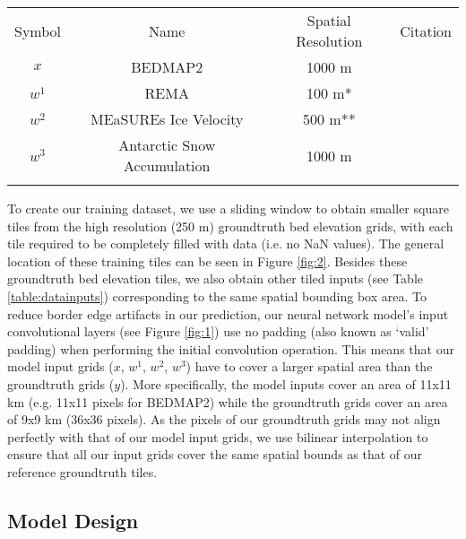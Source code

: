 \documentclass[tc, manuscript]{copernicus}
\begin{document}
\begin{table*}[htbp]
  \caption{Remote Sensing dataset inputs into the DeepBedMap neural network model.}
  \label{table:datainputs}
  \begin{tabular}{cccc}
  \tophline
  Symbol & Name & Spatial Resolution & Citation \\
  \middlehline
  $x$ & BEDMAP2 & 1000 m & \cite{FretwellBedmap2improvedice2013} \\
  $w^1$ & REMA & 100 m* & \cite{HowatReferenceElevationModel2019} \\
  $w^2$ & MEaSUREs Ice Velocity & 500 m** & \cite{MouginotContinentwideinterferometric2019} \\
  $w^3$ & Antarctic Snow Accumulation & 1000 m & \cite{ArthernAntarcticsnowaccumulation2006} \\
  \bottomhline
  \end{tabular}
\end{table*}

To create our training dataset, we use a sliding window to obtain smaller square tiles from the high resolution (250 m) groundtruth bed elevation grids, with each tile required to be completely filled with data (i.e. no NaN values).
The general location of these training tiles can be seen in Figure \ref{fig:2}.
Besides these groundtruth bed elevation tiles, we also obtain other tiled inputs (see Table \ref{table:datainputs}) corresponding to the same spatial bounding box area.
To reduce border edge artifacts in our prediction, our neural network model's input convolutional layers (see Figure \ref{fig:1}) use no padding (also known as `valid' padding) when performing the initial convolution operation.
This means that our model input grids ($x$, $w^1$, $w^2$, $w^3$) have to cover a larger spatial area than the groundtruth grids ($y$).
More specifically, the model inputs cover an area of 11x11 km (e.g. 11x11 pixels for BEDMAP2) while the groundtruth grids cover an area of 9x9 km (36x36 pixels).
As the pixels of our groundtruth grids may not align perfectly with that of our model input grids, we use bilinear interpolation to ensure that all our input grids cover the same spatial bounds as that of our reference groundtruth tiles.

\subsection{Model Design} \label{section:modeldesign}
\end{document}

